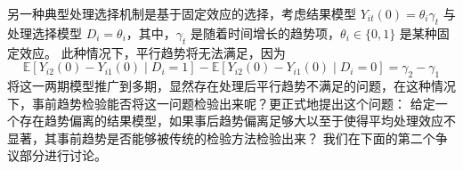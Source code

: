 \documentclass[../didNotes.tex]{subfiles}
\begin{document}
另一种典型处理选择机制是基于固定效应的选择，考虑结果模型 $Y_{i t}(0) = \theta_{i} \gamma_{t}$ 
与处理选择模型 $D_{i} = \theta_{i}$，其中，$\gamma_{t}$ 是随着时间增长的趋势项，$\theta_{i} \in \{ 0,1 \}$ 是某种固定效应。
此种情况下，平行趋势将无法满足，因为
$$
\mathbb{E}[Y_{i 2}(0) - Y_{i 1}(0) \mid D_{i}=1] - \mathbb{E}[Y_{i 2}(0) - Y_{i 1}(0) \mid D_{i}=0] = \gamma_{2} - \gamma_{1}
$$
将这一两期模型推广到多期，显然存在处理后平行趋势不满足的问题，在这种情况下，事前趋势检验能否将这一问题检验出来呢？更正式地提出这个问题：
给定一个存在趋势偏离的结果模型，如果事后趋势偏离足够大以至于使得平均处理效应不显著，其事前趋势是否能够被传统的检验方法检验出来？
我们在下面的第二个争议部分进行讨论。
\end{document}
